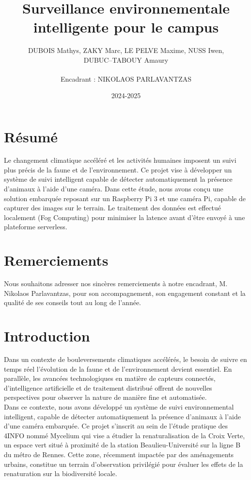 \documentclass[a4paper,11pt]{article}
\title{\textbf{Surveillance environnementale intelligente pour le campus}}
\author{DUBOIS Mathys,	ZAKY Marc,	LE PELVE Maxime,	NUSS Iwen,\\	DUBUC--TABOUY Amaury
	\\ \\
	Encadrant : NIKOLAOS PARLAVANTZAS}
\date{2024-2025}                    %
\begin{document}
	
	\maketitle
	\section*{Résumé}
	Le changement climatique accéléré et les activités humaines imposent un suivi plus précis de la faune et de l'environnement. Ce projet vise à développer un système de suivi intelligent capable de détecter automatiquement la présence d'animaux à l'aide d'une caméra. Dans cette étude, nous avons conçu une solution embarquée reposant sur un Raspberry Pi 3 et une caméra Pi, capable de capturer des images sur le terrain. Le traitement des données est effectué localement (Fog Computing) pour minimiser la latence avant d'être envoyé à une plateforme serverless.
	
	
	\section{Remerciements}
	Nous souhaitons adresser nos sincères remerciements à notre encadrant, M. Nikolaos Parlavantzas, pour son accompagnement, son engagement constant et la qualité de ses conseils tout au long de l’année.
	
	\section{Introduction}
	Dans un contexte de bouleversements climatiques accélérés, le besoin de suivre en temps réel l’évolution de la faune et de l’environnement devient essentiel. En parallèle, les avancées technologiques en matière de capteurs connectés, d'intelligence artificielle et de traitement distribué offrent de nouvelles perspectives pour observer la nature de manière fine et automatisée.\\
	Dans ce contexte, nous avons développé un système de suivi environnemental intelligent, capable de détecter automatiquement la présence d’animaux à l’aide d’une caméra embarquée. Ce projet s’inscrit au sein de l'étude pratique des 4INFO nommé Mycelium qui vise a étudier la renaturalisation de la Croix Verte, un espace vert situé à proximité de la station Beaulieu-Université sur la ligne B du métro de Rennes. Cette zone, récemment impactée par des aménagements urbains, constitue un terrain d’observation privilégié pour évaluer les effets de la renaturation sur la biodiversité locale.
\end{document}
